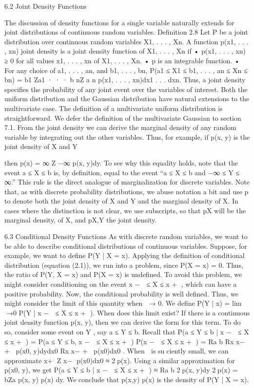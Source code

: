 6.2 Joint Density Functions

The discussion of density functions for a single variable naturally extends for joint distributions of continuous random variables. Definition 2.8 Let P be a joint distribution over continuous random variables X1, . . . , Xn. A function p(x1, . . . , xn) joint density is a joint density function of X1, . . . , Xn if • p(x1, . . . , xn) ≥ 0 for all values x1, . . . , xn of X1, . . . , Xn. • p is an integrable function. • For any choice of a1, . . . , an, and b1, . . . , bn, P(a1 ≤ X1 ≤ b1, . . . , an ≤ Xn ≤ bn) = b1 Za1 · · · b nZ a n p(x1, . . . , xn)dx1 . . . dxn. Thus, a joint density specifies the probability of any joint event over the variables of interest. Both the uniform distribution and the Gaussian distribution have natural extensions to the multivariate case. The definition of a multivariate uniform distribution is straightforward. We defer the definition of the multivariate Gaussian to section 7.1. From the joint density we can derive the marginal density of any random variable by integrating out the other variables. Thus, for example, if p(x, y) is the joint density of X and Y

then p(x) = ∞ Z −∞ p(x, y)dy. To see why this equality holds, note that the event a ≤ X ≤ b is, by definition, equal to the event “a ≤ X ≤ b and −∞ ≤ Y ≤ ∞.” This rule is the direct analogue of marginalization for discrete variables. Note that, as with discrete probability distributions, we abuse notation a bit and use p to denote both the joint density of X and Y and the marginal density of X. In cases where the distinction is not clear, we use subscripts, so that pX will be the marginal density, of X, and pX,Y the joint density.

6.3 Conditional Density Functions
As with discrete random variables, we want to be able to describe conditional distributions of continuous variables. Suppose, for example, we want to define P(Y | X = x). Applying the definition of conditional distribution (equation (2.1)), we run into a problem, since P(X = x) = 0. Thus, the ratio of P(Y, X = x) and P(X = x) is undefined. To avoid this problem, we might consider conditioning on the event x −  ≤ X ≤ x + , which can have a positive probability. Now, the conditional probability is well defined. Thus, we might consider the limit of this quantity when  → 0. We define P(Y | x) = lim →0 P(Y | x −  ≤ X ≤ x + ). When does this limit exist? If there is a continuous joint density function p(x, y), then we can derive the form for this term. To do so, consider some event on Y , say a ≤ Y ≤ b. Recall that P(a ≤ Y ≤ b | x −  ≤ X ≤ x + ) = P(a ≤ Y ≤ b, x −  ≤ X ≤ x + ) P(x −  ≤ X ≤ x + ) = Ra b Rx x− + p(x0, y)dydx0 Rx x− + p(x0)dx0 . When  is suciently small, we can approximate x+ Z x− p(x0)dx0 ≈ 2p(x). Using a similar approximation for p(x0, y), we get P(a ≤ Y ≤ b | x −  ≤ X ≤ x + ) ≈ Ra b 2p(x, y)dy 2p(x) = bZa p(x, y) p(x) dy. We conclude that p(x,y) p(x) is the density of P(Y | X = x).

